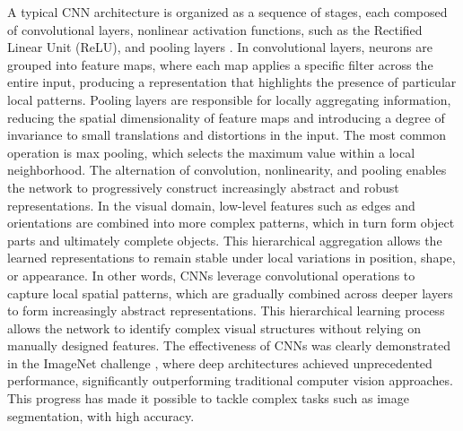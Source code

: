 \documentclass[12pt,a4paper]{report}
\begin{document}
A typical CNN architecture is organized as a sequence of stages, each composed of convolutional layers, nonlinear activation functions, such as the Rectified Linear Unit (ReLU), and pooling layers \cite{chiave1}. In convolutional layers, neurons are grouped into feature maps, where each map applies a specific filter across the entire input, producing a representation that highlights the presence of particular local patterns.
Pooling layers are responsible for locally aggregating information, reducing the spatial dimensionality of feature maps and introducing a degree of invariance to small translations and distortions in the input. The most common operation is max pooling, which selects the maximum value within a local neighborhood. The alternation of convolution, nonlinearity, and pooling enables the network to progressively construct increasingly abstract and robust representations.
In the visual domain, low-level features such as edges and orientations are combined into more complex patterns, which in turn form object parts and ultimately complete objects. This hierarchical aggregation allows the learned representations to remain stable under local variations in position, shape, or appearance. In other words, CNNs leverage convolutional operations to capture local spatial patterns, which are gradually combined across deeper layers to form increasingly abstract representations. This hierarchical learning process allows the network to identify complex visual structures without relying on manually designed features. 
The effectiveness of CNNs was clearly demonstrated in the ImageNet challenge \cite{chiave57}, where deep architectures achieved unprecedented performance, significantly outperforming traditional computer vision approaches. This progress has made it possible to tackle complex tasks such as image segmentation, with high accuracy.
\end{document}
